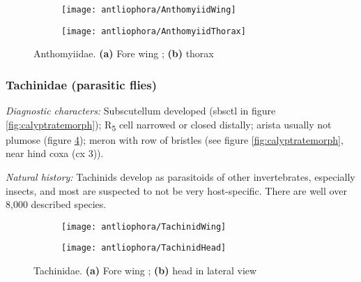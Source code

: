 \begin{figure}[ht!]
    \centering
    \begin{subfigure}[ht!]{0.5\textwidth}
        \texttt{[image: antliophora/AnthomyiidWing]}
        \caption{}
        \label{fig:anthomyiid1}
    \end{subfigure}
    \qquad
    \begin{subfigure}[ht!]{0.4\textwidth}
        \texttt{[image: antliophora/AnthomyiidThorax]}
        \caption{}
        \label{fig:anthomyiid2}
    \end{subfigure}
    \caption{Anthomyiidae. \textbf{(a)} Fore wing \citep[][Fig. 104.29]{mcalpine1981manualv2}; \textbf{(b)} thorax \citep[][Fig. 104.18]{mcalpine1981manualv2}}\label{fig:anthomyiids}
\end{figure}

\subsubsection{Tachinidae (parasitic flies)}
\noindent{}\textit{Diagnostic characters:} Subscutellum developed (sbsctl in figure \ref{fig:calyptratemorph}); \texorpdfstring{R\textsubscript{5}}{R5} cell narrowed or closed distally; arista usually not plumose (figure \ref{fig:tachinid1}); meron with row of bristles (see figure \ref{fig:calyptratemorph}, near hind coxa (cx 3)).\vspace{3mm}

\noindent{}\textit{Natural history:} Tachinids develop as parasitoids of other invertebrates, especially insects, and most are suspected to not be very host-specific. There are well over 8,000 described species.

\begin{figure}[ht!]
    \centering
    \begin{subfigure}[ht!]{0.5\textwidth}
        \texttt{[image: antliophora/TachinidWing]}
        \caption{}
        \label{fig:tachinid1}
    \end{subfigure}
    \qquad
    \begin{subfigure}[ht!]{0.21\textwidth}
        \texttt{[image: antliophora/TachinidHead]}
        \caption{}
        \label{fig:tachinid2}
    \end{subfigure}
    \caption{Tachinidae. \textbf{(a)} Fore wing \citep[][Fig. 110.201]{mcalpine1981manualv2}; \textbf{(b)} head in lateral view \citep[][Fig. 110.91]{mcalpine1981manualv2}}\label{fig:tachinids}
\end{figure}

